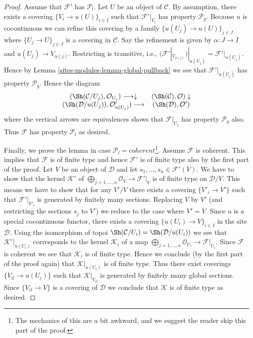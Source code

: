 \begin{proof}
\medskip\noindent
Assume that $\mathcal{F}'$ has $\mathcal{P}_l$.
Let $U$ be an object of $\mathcal{C}$.
By assumption, there exists a covering
$\{V_i \to u(U)\}_{i \in I}$ such that $\mathcal{F}'|_{V_i}$
has property $\mathcal{P}_g$. Because $u$ is cocontinuous we
can refine this covering by a family $\{u(U_j) \to u(U)\}_{j \in J}$
where $\{U_j \to U\}_{j \in J}$ is a covering in $\mathcal{C}$.
Say the refinement is given by $\alpha : J \to I$ and
$u(U_j) \to V_{\alpha(j)}$.
Restricting is transitive, i.e.,
$(\mathcal{F}'|_{V_{\alpha(j)}})|_{u(U_j)} = \mathcal{F}'|_{u(U_j)}$.
Hence by Lemma \ref{sites-modules-lemma-global-pullback} we see that
$\mathcal{F}'|_{u(U_j)}$ has property $\mathcal{P}_g$.
Hence the diagram
$$
\begin{array}{cc}(\Sh(\mathcal{C}/U_j), \mathcal{O}_{U_j}) \longrightarrow\downarrow & (\Sh(\mathcal{C}), \mathcal{O}) \downarrow \\ (\Sh(\mathcal{D}/u(U_j)), \mathcal{O}'_{u(U_j)})
\longrightarrow & (\Sh(\mathcal{D}), \mathcal{O}')\end{array}
$$
where the vertical arrows are equivalences shows that $\mathcal{F}|_{U_j}$
has property $\mathcal{P}_g$ also. Thus $\mathcal{F}$ has
property $\mathcal{P}_l$ as desired.

\medskip\noindent
Finally, we prove the lemma in case
$\mathcal{P}_l = coherent$\footnote{The mechanics of this
are a bit awkward, and we suggest the reader skip this part of the proof.}.
Assume $\mathcal{F}$ is coherent. This implies that $\mathcal{F}$
is of finite type and hence $\mathcal{F}'$ is of finite type also by the
first part of the proof. Let $V$ be an object of $\mathcal{D}$ and let
$s_1, \ldots, s_n \in \mathcal{F}'(V)$. We have to show that the kernel
$\mathcal{K}'$ of
$\bigoplus_{j = 1, \ldots, n} \mathcal{O}_V \to \mathcal{F}'|_V$
is of finite type on $\mathcal{D}/V$. This means we have to show that
for any $V'/V$ there exists a covering $\{V'_i \to V'\}$ such that
$\mathcal{F}'|_{V'_i}$ is generated by finitely many sections.
Replacing $V$ by $V'$ (and restricting the sections $s_j$ to $V'$)
we reduce to the case where $V' = V$. Since $u$ is a special
cocontinuous functor, there exists a covering $\{u(U_i) \to V\}_{i \in I}$
in the site $\mathcal{D}$. Using the isomorphism of topoi
$\Sh(\mathcal{C}/U_i) = \Sh(\mathcal{D}/u(U_i))$
we see that $\mathcal{K}'|_{u(U_i)}$ corresponds to the kernel
$\mathcal{K}_i$ of a map
$\bigoplus_{j = 1, \ldots, n} \mathcal{O}_{U_i} \to \mathcal{F}|_{U_i}$.
Since $\mathcal{F}$ is coherent we see that $\mathcal{K}_i$
is of finite type. Hence we conclude (by the first part of the proof again)
that $\mathcal{K}|_{u(U_i)}$ is of finite type. Thus there exist coverings
$\{V_{il} \to u(U_i)\}$ such that $\mathcal{K}|_{V_{il}}$ is generated
by finitely many global sections. Since
$\{V_{il} \to V\}$ is a covering of $\mathcal{D}$ we conclude that
$\mathcal{K}$ is of finite type as desired.


\end{proof}
